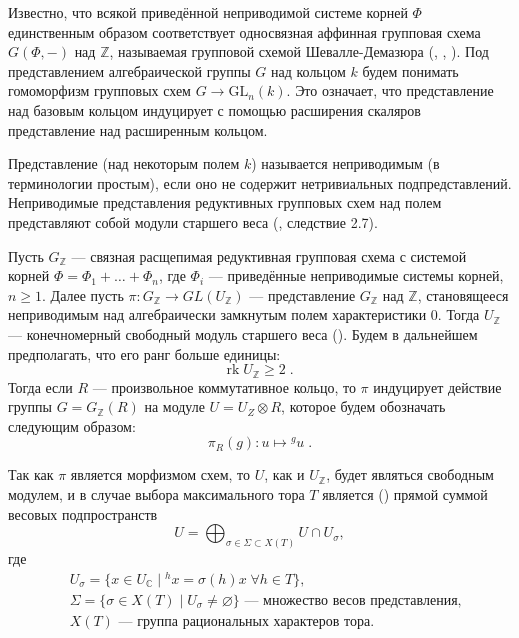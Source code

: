 \documentclass[12pt]{matmex-diploma}
\theoremstyle{mystyleni}
\theoremstyle{mystyle}
\newcommand{\Z}{\mathbb{Z}}
\renewcommand{\C}{\mathbb{C}}
\renewcommand{\ge}{\geqslant}
\begin{document}
Известно, что всякой приведённой неприводимой системе корней $\Phi$ единственным образом соответствует односвязная аффинная групповая схема $G(\Phi,-)$ над $\Z$, называемая групповой схемой Шевалле-Демазюра (\cite{Plotkin1998}, \cite{Steinberg2016}, \cite{Chevalley1960-1961}).
Под представлением алгебраической группы $G$ над кольцом $k$ будем понимать гомоморфизм групповых схем $G \to \mathrm{GL}_n(k)$. Это означает, что представление над базовым кольцом индуцирует с помощью расширения скаляров представление над расширенным кольцом.

Представление (над некоторым полем $k$) называется неприводимым (в терминологии \cite{Milne2017} простым), если оно не содержит нетривиальных подпредставлений.
Неприводимые представления редуктивных групповых схем над полем представляют собой модули старшего веса (\cite{Jantzen1987}, следствие 2.7).




Пусть $G_\Z$ --- связная расщепимая редуктивная групповая схема с системой корней $\Phi = \Phi_1 + \dots + \Phi_n$, где $\Phi_i$ --- приведённые неприводимые системы корней, $n \ge 1$.
\linebreak
Далее пусть $\pi:G_\Z \to GL(U_\Z)$ --- представление $G_\Z$ над $\Z$, становящееся неприводимым над алгебраически замкнутым полем характеристики $0$. Тогда $U_\Z$ --- конечномерный свободный модуль старшего веса (\cite{Conrad11reductivegroup}). Будем в дальнейшем предполагать, что его ранг больше единицы:
\begin{equation*}
\mathrm{rk} \; U_\Z \ge 2 \;.
\end{equation*}
Тогда если $R$ --- произвольное коммутативное кольцо, то $\pi$ индуцирует действие группы $G=G_\Z(R)$ на модуле $U = U_Z \otimes R$,  которое будем обозначать следующим образом:
$$ \pi_R(g) : u \mapsto {}^g u \; . $$

Так как $\pi$ является морфизмом схем, то $U$, как и $U_\Z$, будет являться свободным модулем, и в случае выбора максимального тора $T$ является (\citep{Borel1970}) прямой суммой весовых подпространств
$$U=\bigoplus_{\sigma \in \Sigma \subset X(T)} {U \cap U_\sigma} ,$$
где
\begin{equation*}
\begin{split}
& U_\sigma = \{x \in U_\C \; | \; ^h x = \sigma(h) x \; \forall h \in T \},\\
& \Sigma = \{\sigma \in X(T) \; | \; U_\sigma \ne \varnothing\} \text{ --- множество весов представления,}\\
& X(T) \text{ --- группа рациональных характеров тора.}
\end{split}
\end{equation*}
\end{document}

